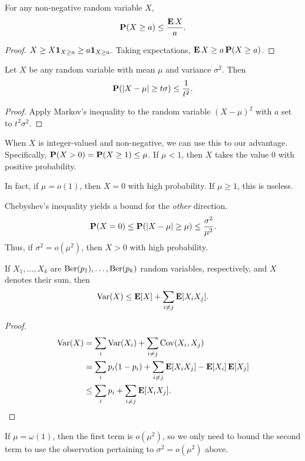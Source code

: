 \begin{theorem} \label{thm:markov}
    For any non-negative random variable $X$, \[
        \P(X \ge a) \le \frac{\E X}{a}.
    \]
\end{theorem}
\begin{proof}
    $X \ge X \1{X \ge a} \ge a \1{X \ge a}$.
    Taking expectations, $\E X \ge a \P(X \ge a)$.
\end{proof}

\begin{theorem} \label{thm:chebyshev}
    Let $X$ be any random variable with mean $\mu$ and variance $\sigma^2$.
    Then \[
        \P(\abs{X - \mu} \ge t \sigma) \le \frac1{t^2}.
    \]
\end{theorem}
\begin{proof}
    Apply Markov's inequality to the random variable $(X - \mu)^2$ with
    $a$ set to $t^2 \sigma^2$.
\end{proof}

When $X$ is integer-valued and non-negative, we can use this to our
advantage.
Specifically, $\P(X > 0) = \P(X \ge 1) \le \mu$.
If $\mu < 1$, then $X$ takes the value $0$ with positive probability.

In fact, if $\mu = o(1)$, then $X = 0$ with high probability.
If $\mu \ge 1$, this is useless.

Chebyshev's inequality yields a bound for the \emph{other} direction. \[
    \P(X = 0) \le \P(\abs{X - \mu} \ge \mu) \le \frac{\sigma^2}{\mu^2}.
\] Thus, if $\sigma^2 = o(\mu^2)$, then $X > 0$ with high probability.

\begin{lemma}
    If $X_1, \dots, X_k$ are $\Ber(p_1), \dots, \Ber(p_k)$ random variables,
    respectively, and $X$ denotes their sum, then \[
        \Var(X) \le \E[X] + \sum_{i \ne j} \E[X_i X_j].
    \]
\end{lemma}
\begin{proof}
    \begin{align*}
        \Var(X) &= \sum_i \Var(X_i) + \sum_{i \ne j} \Cov(X_i, X_j) \\
            &= \sum_i p_i(1 - p_i) + \sum_{i \ne j} \E[X_i X_j] - \E[X_i] \E[X_j] \\
            &\le \sum_i p_i + \sum_{i \ne j} \E[X_i X_j]. \qedhere
    \end{align*}
\end{proof}
If $\mu = \omega(1)$, then the first term is $o(\mu^2)$,
so we only need to bound the second term to use the observation pertaining
to $\sigma^2 = o(\mu^2)$ above.

